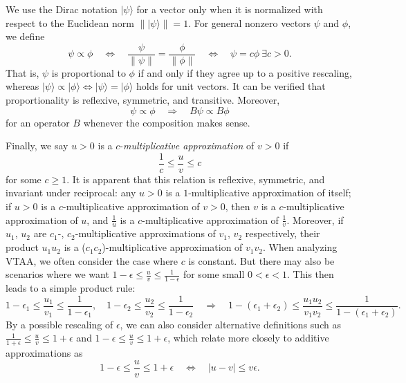 \documentclass[letterpaper,onecolumn,11pt,accepted=2026-02-14]{quantumarticle}
\newcommand{\abs}[1]{\left\lvert#1\right\rvert}
\newcommand{\norm}[1]{\left\lVert#1\right\rVert}
\theoremstyle{remark}
\theoremstyle{plain}
\newcommand{\ket}[1]{|#1\rangle}
\begin{document}
We use the Dirac notation $\ket{\psi}$ for a vector only when it is normalized with respect to the Euclidean norm $\norm{\ket{\psi}}=1$. For general nonzero vectors $\psi$ and $\phi$, we define
\begin{equation}
    \psi\propto\phi
    \quad\Leftrightarrow\quad
    \frac{\psi}{\norm{\psi}}=\frac{\phi}{\norm{\phi}}
    \quad\Leftrightarrow\quad
    \psi=c\phi\ \exists c>0.
\end{equation}
That is, $\psi$ is proportional to $\phi$ if and only if they agree up to a positive rescaling, whereas $\ket{\psi}\propto\ket{\phi}\Leftrightarrow \ket{\psi}=\ket{\phi}$ holds for unit vectors. It can be verified that proportionality is reflexive, symmetric, and transitive. Moreover, 
\begin{equation}
    \psi\propto\phi
    \quad\Rightarrow\quad
    B\psi\propto B\phi
\end{equation}
for an operator $B$ whenever the composition makes sense.

Finally, we say $u>0$ is a $c$-\emph{multiplicative approximation} of $v>0$ if
\begin{equation}
    \frac{1}{c}\leq\frac{u}{v}\leq c
\end{equation}
for some $c\geq 1$. It is apparent that this relation is reflexive, symmetric, and invariant under reciprocal: any $u>0$ is a $1$-multiplicative approximation of itself; if $u>0$ is a $c$-multiplicative approximation of $v>0$, then $v$ is a $c$-multiplicative approximation of $u$, and $\frac{1}{u}$ is a $c$-multiplicative approximation of $\frac{1}{v}$. Moreover, if $u_1$, $u_2$ are $c_1$-, $c_2$-multiplicative approximations of $v_1$, $v_2$ respectively, their product $u_1u_2$ is a ($c_1c_2$)-multiplicative approximation of $v_1v_2$. When analyzing VTAA, we often consider the case where $c$ is constant. But there may also be scenarios where we want $1-\epsilon\leq\frac{u}{v}\leq\frac{1}{1-\epsilon}$ for some small $0<\epsilon<1$. This then leads to a simple product rule:
\begin{equation}
    1-\epsilon_1\leq\frac{u_1}{v_1}\leq\frac{1}{1-\epsilon_1},\quad
    1-\epsilon_2\leq\frac{u_2}{v_2}\leq\frac{1}{1-\epsilon_2}
    \quad\Rightarrow\quad
    1-(\epsilon_1+\epsilon_2)\leq\frac{u_1u_2}{v_1v_2}\leq\frac{1}{1-(\epsilon_1+\epsilon_2)}.
\end{equation}
By a possible rescaling of $\epsilon$, we can also consider alternative definitions such as $\frac{1}{1+\epsilon}\leq\frac{u}{v}\leq1+\epsilon$ and $1-\epsilon\leq\frac{u}{v}\leq1+\epsilon$, which relate more closely to additive approximations as
\begin{equation}
    1-\epsilon\leq\frac{u}{v}\leq1+\epsilon
    \quad\Leftrightarrow\quad
    \abs{u-v}\leq v\epsilon.
\end{equation}
\end{document}
